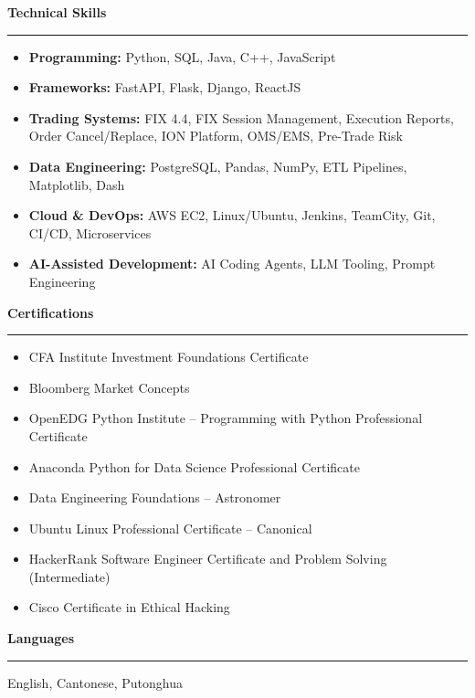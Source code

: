 \documentclass[10pt,a4paper]{article}
\newcommand{\resumesection}[1]{%
    \vspace{1.4ex}
    {\large\bfseries #1}\par
    \vspace{0.4ex}
    \hrule
    \vspace{0.7ex}
}
\begin{document}
\resumesection{Technical Skills}

\begin{itemize}
    \item \textbf{Programming:} Python, SQL, Java, C++, JavaScript

    \item \textbf{Frameworks:} FastAPI, Flask, Django, ReactJS

    \item \textbf{Trading Systems:} FIX 4.4, FIX Session
    Management, Execution Reports, Order Cancel/Replace,
    ION Platform, OMS/EMS, Pre-Trade Risk

    \item \textbf{Data Engineering:} PostgreSQL, Pandas,
    NumPy, ETL Pipelines, Matplotlib, Dash

    \item \textbf{Cloud \& DevOps:} AWS EC2, Linux/Ubuntu,
    Jenkins, TeamCity, Git, CI/CD, Microservices

    \item \textbf{AI-Assisted Development:} AI Coding Agents,
    LLM Tooling, Prompt Engineering
\end{itemize}

\resumesection{Certifications}

\begin{itemize}
    \item CFA Institute Investment Foundations Certificate
    \item Bloomberg Market Concepts
    \item OpenEDG Python Institute -- Programming with Python
    Professional Certificate
    \item Anaconda Python for Data Science Professional Certificate
    \item Data Engineering Foundations -- Astronomer
    \item Ubuntu Linux Professional Certificate -- Canonical
    \item HackerRank Software Engineer Certificate and
    Problem Solving (Intermediate)
    \item Cisco Certificate in Ethical Hacking
\end{itemize}

\resumesection{Languages}

English, Cantonese, Putonghua
\end{document}
